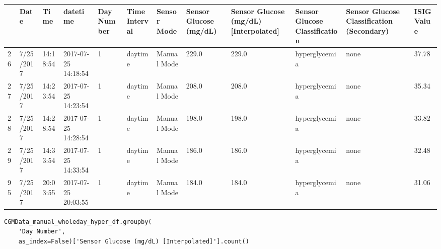 \bigskip\noindent
\begin{tabular}{p{}p{}p{}p{}p{}p{}p{}p{}p{}p{}p{}p{}}
\toprule
 & Date & Time & datetime & Day Number & Time Interval & Sensor Mode & Sensor Glucose (mg/dL) & Sensor Glucose (mg/dL) [Interpolated] & Sensor Glucose Classification & Sensor Glucose Classification (Secondary) & ISIG Value \\
\hline
26 & 7/25/2017 & 14:18:54 & 2017-07-25 14:18:54 & 1 & daytime & Manual Mode & 229.0 & 229.0 & hyperglycemia & none & 37.78 \\
\hline
27 & 7/25/2017 & 14:23:54 & 2017-07-25 14:23:54 & 1 & daytime & Manual Mode & 208.0 & 208.0 & hyperglycemia & none & 35.34 \\
\hline
28 & 7/25/2017 & 14:28:54 & 2017-07-25 14:28:54 & 1 & daytime & Manual Mode & 198.0 & 198.0 & hyperglycemia & none & 33.82 \\
\hline
29 & 7/25/2017 & 14:33:54 & 2017-07-25 14:33:54 & 1 & daytime & Manual Mode & 186.0 & 186.0 & hyperglycemia & none & 32.48 \\
\hline
95 & 7/25/2017 & 20:03:55 & 2017-07-25 20:03:55 & 1 & daytime & Manual Mode & 184.0 & 184.0 & hyperglycemia & none & 31.06 \\
\hline
\bottomrule
\end{tabular}

\bigskip

\begin{verbatim}
CGMData_manual_wholeday_hyper_df.groupby(
    'Day Number', 
    as_index=False)['Sensor Glucose (mg/dL) [Interpolated]'].count()
\end{verbatim}

